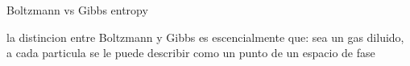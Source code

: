 Boltzmann vs Gibbs entropy

la distincion entre Boltzmann y Gibbs es escencialmente que:
sea un gas diluido, a cada particula se le puede describir como un punto de un espacio de fase
